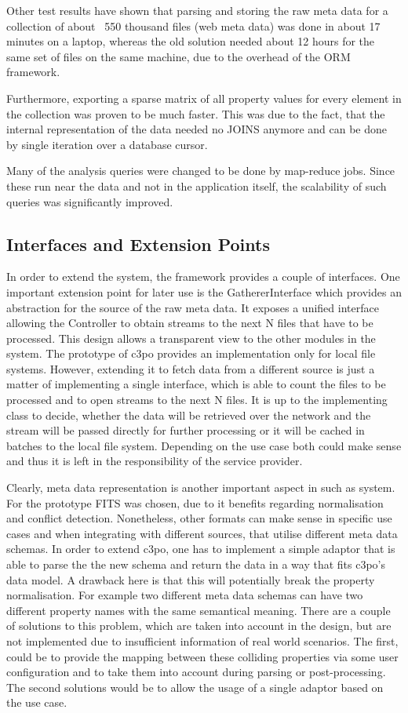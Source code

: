 Other test results have shown that parsing and storing the raw meta data for a collection of about ~550 thousand files (web meta data) was done in about 17 minutes on a laptop, whereas the old solution needed about 12 hours for the same set of files on the same machine, due to the overhead of the ORM framework.

Furthermore, exporting a sparse matrix of all property values for every element in the collection was proven to be much faster. This was due to the fact, that the internal representation of the data needed no JOINS anymore and can be done by single iteration over a database cursor.

Many of the analysis queries were changed to be done by map-reduce jobs. Since these run near the data and not in the application itself, the scalability of such queries was significantly improved.

\subsection{Interfaces and Extension Points}
In order to extend the system, the framework provides a couple of interfaces. One important extension point for later use is the GathererInterface which provides an abstraction for the source of the raw meta data. It exposes a unified interface allowing the Controller to obtain streams to the next N files that have to be processed. This design allows a transparent view to the other modules in the system. The prototype of c3po provides an implementation only for local file systems. However, extending it to fetch data from a different source is just a matter of implementing a single interface, which is able to count the files to be processed and to open streams to the next N files. It is up to the implementing class to decide, whether the data will be retrieved over the network and the stream will be passed directly for further processing or it will be cached in batches to the local file system. Depending on the use case both could make sense and thus it is left in the responsibility of the service provider.

Clearly, meta data representation is another important aspect in such as system. For the prototype FITS was chosen, due to it benefits regarding normalisation and conflict detection. Nonetheless, other formats can make sense in specific use cases and when integrating with different sources, that utilise different meta data schemas. In order to extend c3po, one has to implement a simple adaptor that is able to parse the the new schema and return the data in a way that fits c3po's data model. A drawback here is that this will potentially break the property normalisation. For example two different meta data schemas can have two different property names with the same semantical meaning. There are a couple of solutions to this problem, which are taken into account in the design, but are not implemented due to insufficient information of real world scenarios. The first, could be to provide the mapping between these colliding properties via some user configuration and to take them into account during parsing or post-processing. The second solutions would be to allow the usage of a single adaptor based on the use case.

